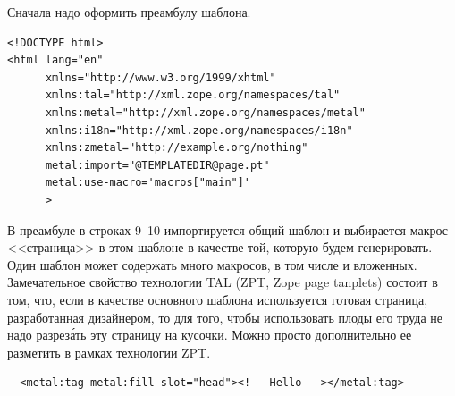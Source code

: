 \documentclass[a4paper,14pt,openany,final]{extreport} %
\begin{document}
{Сначала надо оформить преамбулу шаблона.
\begin{verbatim}
<!DOCTYPE html>
<html lang="en"
      xmlns="http://www.w3.org/1999/xhtml"
      xmlns:tal="http://xml.zope.org/namespaces/tal"
      xmlns:metal="http://xml.zope.org/namespaces/metal"
      xmlns:i18n="http://xml.zope.org/namespaces/i18n"
      xmlns:zmetal="http://example.org/nothing"
      metal:import="@TEMPLATEDIR@page.pt"
      metal:use-macro='macros["main"]'
      >
\end{verbatim}
В преамбуле в строках 9--10 импортируется общий шаблон и выбирается макрос <<страница>> в этом шаблоне в качестве той, которую будем генерировать. Один шаблон может содержать много макросов, в том числе и вложенных. Замечательное свойство технологии TAL (ZPT, \foreignlanguage{english}{Zope page tanplets}) состоит в том, что, если в качестве основного шаблона используется готовая страница, разработанная дизайнером, то для того, чтобы использовать плоды его труда не надо разрез\'ать эту страницу на кусочки. Можно просто дополнительно ее разметить в рамках технологии ZPT.
\begin{verbatim}
  <metal:tag metal:fill-slot="head"><!-- Hello --></metal:tag>


\end{verbatim}}
\end{document}
